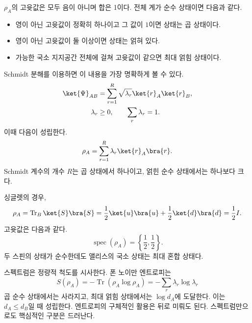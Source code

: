 \(\rho_A\)의 고윳값은 모두 음이 아니며 합은 1이다. 전체 계가 순수 상태이면 다음과 같다.
\begin{itemize}
\item 영이 아닌 고윳값이 정확히 하나이고 그 값이 \(1\)이면 상태는 곱 상태이다.
\item 영이 아닌 고윳값이 둘 이상이면 상태는 얽혀 있다.
\item 가능한 국소 지지공간 전체에 걸쳐 고윳값이 같으면 최대 얽힘 상태이다.
\end{itemize}
Schmidt 분해를 이용하면 이 내용을 가장 명확하게 볼 수 있다.
\begin{equation}
\begin{aligned}
\ket{\Psi}_{AB}
&=\sum_{r=1}^{R}\sqrt{\lambda_r}
\ket{r}_A\ket{r}_B,\\
\lambda_r&\geq0,
\qquad
\sum_r\lambda_r=1.
\end{aligned}
\label{eq:l7-schmidt}
\end{equation}
이때 다음이 성립한다.
\begin{equation}
\rho_A=\sum_{r=1}^{R}\lambda_r\ket{r}_A\bra{r}.
\label{eq:l7-schmidt-density}
\end{equation}
Schmidt 계수의 개수 \(R\)는 곱 상태에서 하나이고, 얽힌 순수 상태에서는 하나보다 크다.

싱글렛의 경우,
\begin{equation}
\rho_A
=\operatorname{Tr}_B\ket{S}\bra{S}
=\frac12\ket{u}\bra{u}
+\frac12\ket{d}\bra{d}
=\frac12 I.
\label{eq:l7-singlet-reduced-density}
\end{equation}
고윳값은 다음과 같다.
\begin{equation}
\operatorname{spec}(\rho_A)
=\left\{\frac12,\frac12\right\}.
\end{equation}
두 스핀의 상태가 순수한데도 앨리스의 국소 상태는 최대 혼합 상태다.

스펙트럼은 정량적 척도를 시사한다. 폰 노이만 엔트로피는
\begin{equation}
S(\rho_A)
=-\operatorname{Tr}(\rho_A\log\rho_A)
=-\sum_r\lambda_r\log\lambda_r
\label{eq:l7-entanglement-entropy}
\end{equation}
곱 순수 상태에서는 사라지고, 최대 얽힘 상태에서는 \(\log d_A\)에 도달한다. 이는 \(d_A\leq d_B\)일 때 성립한다. 엔트로피의 구체적인 활용은 뒤로 미뤄도 된다. 스펙트럼만으로도 핵심적인 구분은 드러난다.

\begin{classroomqa}
\end{classroomqa}


